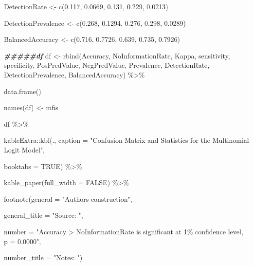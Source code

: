 \documentclass[a4paper,nobind]{templates/ociamthesis}
\newenvironment{Shaded}{\begin{snugshade}}{\end{snugshade}}
\newcommand{\AttributeTok}[1]{\textcolor[rgb]{0.77,0.63,0.00}{#1}}
\newcommand{\ConstantTok}[1]{\textcolor[rgb]{0.00,0.00,0.00}{#1}}
\newcommand{\DocumentationTok}[1]{\textcolor[rgb]{0.56,0.35,0.01}{\textbf{\textit{#1}}}}
\newcommand{\FloatTok}[1]{\textcolor[rgb]{0.00,0.00,0.81}{#1}}
\newcommand{\FunctionTok}[1]{\textcolor[rgb]{0.00,0.00,0.00}{#1}}
\newcommand{\NormalTok}[1]{#1}
\newcommand{\OtherTok}[1]{\textcolor[rgb]{0.56,0.35,0.01}{#1}}
\newcommand{\SpecialCharTok}[1]{\textcolor[rgb]{0.00,0.00,0.00}{#1}}
\newcommand{\StringTok}[1]{\textcolor[rgb]{0.31,0.60,0.02}{#1}}
\renewenvironment{Shaded}
{
  \vspace{10pt}%
  \begin{snugshade}%
}{%
  \end{snugshade}%
  \vspace{8pt}%
}
\begin{document}
\begin{Shaded}
\begin{Highlighting}[]
\NormalTok{DetectionRate }\OtherTok{\textless{}{-}} \FunctionTok{c}\NormalTok{(}\FloatTok{0.117}\NormalTok{, }\FloatTok{0.0669}\NormalTok{, }\FloatTok{0.131}\NormalTok{, }\FloatTok{0.229}\NormalTok{, }\FloatTok{0.0213}\NormalTok{)}

\NormalTok{DetectionPrevalence }\OtherTok{\textless{}{-}} \FunctionTok{c}\NormalTok{(}\FloatTok{0.268}\NormalTok{, }\FloatTok{0.1294}\NormalTok{, }\FloatTok{0.276}\NormalTok{, }\FloatTok{0.298}\NormalTok{, }\FloatTok{0.0289}\NormalTok{)}

\NormalTok{BalancedAccuracy }\OtherTok{\textless{}{-}} \FunctionTok{c}\NormalTok{(}\FloatTok{0.716}\NormalTok{, }\FloatTok{0.7726}\NormalTok{, }\FloatTok{0.639}\NormalTok{, }\FloatTok{0.735}\NormalTok{, }\FloatTok{0.7926}\NormalTok{)}
 
\DocumentationTok{\#\#\#\#\#df}
\NormalTok{df }\OtherTok{\textless{}{-}} \FunctionTok{rbind}\NormalTok{(Accuracy, NoInformationRate, Kappa, sensitivity, specificity, PosPredValue, NegPredValue, Prevalence, DetectionRate, DetectionPrevalence, BalancedAccuracy) }\SpecialCharTok{\%\textgreater{}\%} 
  
  \FunctionTok{data.frame}\NormalTok{()}

\FunctionTok{names}\NormalTok{(df) }\OtherTok{\textless{}{-}}\NormalTok{ mfis}

\NormalTok{df }\SpecialCharTok{\%\textgreater{}\%} 
  
\NormalTok{  kableExtra}\SpecialCharTok{::}\FunctionTok{kbl}\NormalTok{(., }\AttributeTok{caption =} \StringTok{"Confusion Matrix and Statistics for the Multinomial Logit Model"}\NormalTok{, }
      
  \AttributeTok{booktabs =} \ConstantTok{TRUE}\NormalTok{) }\SpecialCharTok{\%\textgreater{}\%} 
  
  \FunctionTok{kable\_paper}\NormalTok{(}\AttributeTok{full\_width =} \ConstantTok{FALSE}\NormalTok{) }\SpecialCharTok{\%\textgreater{}\%} 
  
  \FunctionTok{footnote}\NormalTok{(}\AttributeTok{general =} \StringTok{"Authors\textquotesingle{} construction"}\NormalTok{,}
           
  \AttributeTok{general\_title =} \StringTok{"Source: "}\NormalTok{,}
  
  \AttributeTok{number =} \StringTok{"Accuracy \textgreater{} NoInformationRate is significant at 1\% confidence level, p = 0.0000"}\NormalTok{,}
  
  \AttributeTok{number\_title =} \StringTok{"Notes: "}\NormalTok{)}
\end{Highlighting}
\end{Shaded}
\end{document}
